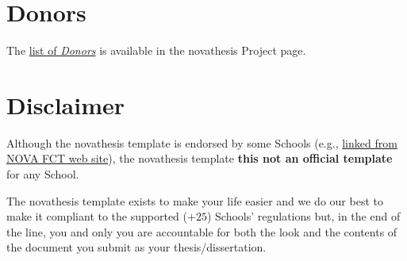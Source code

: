 



\section{Donors}
\label{sec:donations}

\ntindex[donations]{}

The \href{https://github.com/joaomlourenco/novathesis/wiki#donators}{list of \emph{Donors}} is available in the \gls{novathesis} Project page.


\section{Disclaimer}
\label{sec:disclaimer}

\ntindex[disclaimer]{}

Although the \gls{novathesis} template is endorsed by some Schools (e.g., \href{https://www.fct.unl.pt/estudante/informacao-academica/teses-e-dissertacoes}{linked from NOVA FCT web site}), the \gls{novathesis} template \textbf{this not an official template} for any School.

The \gls{novathesis} template exists to make your life easier and we do our best to make it compliant to the supported ($+25$) Schools' regulations but, in the end of the line, you and only you are accountable for both the look and the contents of the document you submit as your thesis/dissertation.
